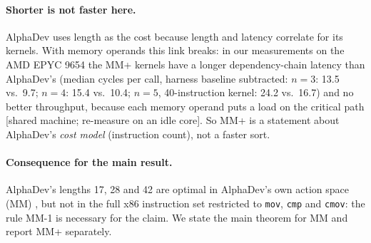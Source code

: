\paragraph{Shorter is not faster here.} AlphaDev uses length as the cost because length and latency correlate for its
kernels. With memory operands this link breaks: in our measurements on the AMD EPYC 9654 the MM+ kernels have a longer
dependency-chain latency than AlphaDev's (median cycles per call, harness baseline subtracted: $n = 3$: 13.5 vs.\ 9.7;
$n = 4$: 15.4 vs.\ 10.4; $n = 5$, 40-instruction kernel: 24.2 vs.\ 16.7) and no better throughput, because each memory operand puts a load on the
critical path \pending{} [shared machine; re-measure on an idle core]. So MM+ is a statement about AlphaDev's \emph{cost model}
(instruction count), not a faster sort.

\paragraph{Consequence for the main result.} AlphaDev's lengths 17, 28 and 42 are optimal in AlphaDev's own action space
(MM) \pending, but not in the full x86 instruction set restricted to \texttt{mov}, \texttt{cmp} and \texttt{cmov}: the rule
MM-1 is necessary for the claim. We state the main theorem for MM and report MM+ separately.
